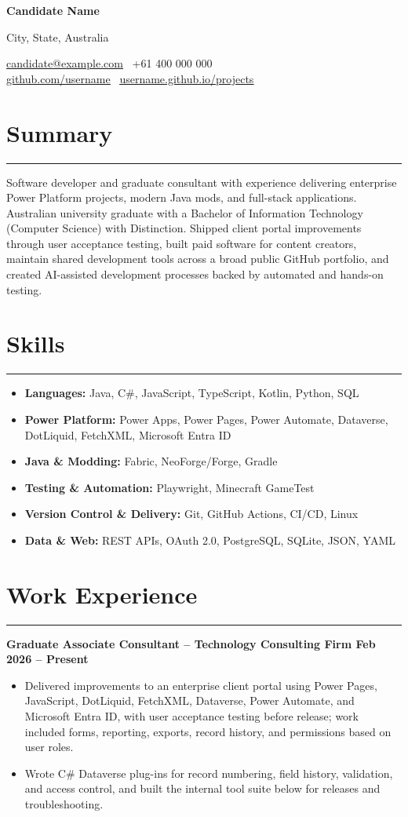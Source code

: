 \documentclass[10pt,a4paper]{article}
\newcommand{\documentlink}[2]{\href{#1}{\underline{#2}}}
\newcommand{\ressection}[1]{%
  \section*{#1}%
  \vspace{-12pt}%
  \noindent\rule{\textwidth}{0.4pt}%
  \vspace{0pt}%
}
\begin{document}
\begin{center}

{\LARGE \textbf{Candidate Name}}

City, State, Australia

\documentlink{mailto:candidate@example.com}{candidate@example.com} \textbar\ +61 400 000 000 \\
\documentlink{https://github.com/username}{github.com/username} \textbar\ \documentlink{https://username.github.io/projects/}{username.github.io/projects}

\end{center}

\ressection{Summary}

Software developer and graduate consultant with experience delivering enterprise Power Platform projects, modern Java mods, and full-stack applications. Australian university graduate with a Bachelor of Information Technology (Computer Science) with Distinction. Shipped client portal improvements through user acceptance testing, built paid software for content creators, maintain shared development tools across a broad public GitHub portfolio, and created AI-assisted development processes backed by automated and hands-on testing.

\ressection{Skills}

\begin{itemize}
      \item \textbf{Languages:} Java, C\#, JavaScript, TypeScript, Kotlin, Python, SQL
      \item \textbf{Power Platform:} Power Apps, Power Pages, Power Automate, Dataverse, DotLiquid, FetchXML, Microsoft Entra ID
      \item \textbf{Java \& Modding:} Fabric, NeoForge/Forge, Gradle
      \item \textbf{Testing \& Automation:} Playwright, Minecraft GameTest
      \item \textbf{Version Control \& Delivery:} Git, GitHub Actions, CI/CD, Linux
      \item \textbf{Data \& Web:} REST APIs, OAuth 2.0, PostgreSQL, SQLite, JSON, YAML
\end{itemize}

\ressection{Work Experience}

\textbf{Graduate Associate Consultant -- Technology Consulting Firm \hfill Feb 2026 -- Present}
\begin{itemize}
      \item Delivered improvements to an enterprise client portal using Power Pages, JavaScript, DotLiquid, FetchXML, Dataverse, Power Automate, and Microsoft Entra ID, with user acceptance testing before release; work included forms, reporting, exports, record history, and permissions based on user roles.
      \item Wrote C\# Dataverse plug-ins for record numbering, field history, validation, and access control, and built the internal tool suite below for releases and troubleshooting.
\end{itemize}
\end{document}
